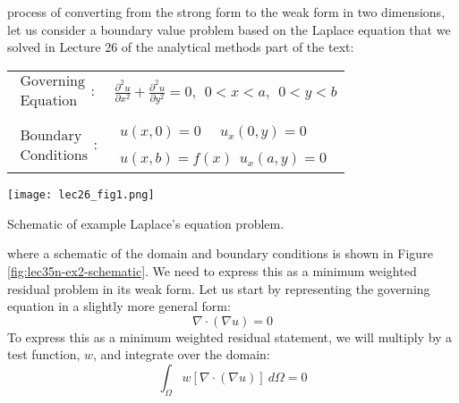  process of converting from the strong form to the weak form in two dimensions, let us consider a boundary value problem based on the Laplace equation that we solved in Lecture 26 of the analytical methods part of the text:
\begin{table}[h]
\begin{tabular}{l l}
$\substack{\text{Governing} \\\text{Equation}}: $& $\frac{\partial^2 u}{\partial x^2} + \frac{\partial^2 u}{\partial y^2} = 0, \ \ 0<x<a, \ \ 0<y<b $\\
& \\
$\substack{\text{Boundary} \\ \text{Conditions}}: $ & $\substack{u(x,0)=0  \ \ \ \ \ \ u_x(0,y) = 0 \\ \\ u(x,b) = f(x) \ \ u_x(a,y) = 0}$ 
\end{tabular}
\end{table} 
\begin{marginfigure}
\texttt{[image: lec26\_fig1.png]}
\caption{Schematic of example Laplace's equation problem.}
\label{fig:lec35n-ex2-schematic}
\end{marginfigure}  
\noindent where a schematic of the domain and boundary conditions is shown in Figure \ref{fig:lec35n-ex2-schematic}.  We need to express this as a minimum weighted residual problem in its weak form.  Let us start by representing the governing equation in a slightly more general form:
\begin{equation*}
\nabla \cdot \left( \nabla u \right) = 0
\end{equation*}
\noindent To express this as a minimum weighted residual statement, we will multiply by a test function, $w$, and integrate over the domain:
\begin{equation*}
\int_{\Omega} w \left[ \nabla \cdot \left( \nabla u \right) \right] \ d\Omega = 0
\end{equation*}
